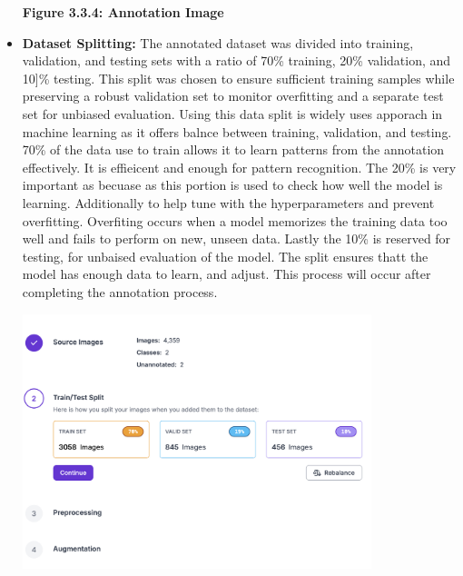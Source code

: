 \begin{itemize}
\begin{center}
		\vspace{0.5em}
		\textbf{Figure 3.3.4: Annotation Image}
	\end{center}
	\newpage
	\item \textbf{Dataset Splitting:}  The annotated dataset was divided into training, validation, and testing sets with a ratio of 70\% training, 20\% validation, and 10]\% testing. This split was chosen to ensure sufficient training samples while preserving a robust validation set to monitor overfitting and a separate test set for unbiased evaluation. Using this data split is widely uses apporach in machine learning as it offers balnce between training, validation, and testing. 70\% of the data use to train allows it to learn patterns from the annotation effectively. It is effieicent and enough for pattern recognition. The 20\% is very important as becuase as this portion is used to check how well the model is learning. Additionally to help tune with the hyperparameters and prevent overfitting. Overfiting occurs when a  model memorizes the training data too well and fails to perform on new, unseen data.  Lastly the 10\% is reserved for testing, for unbaised evaluation of the model. The split ensures thatt the model has enough data to learn, and adjust. This process will occur after completing the annotation process.		
	\begin{center}
		\includegraphics[width=0.8\textwidth]{Split.png}
		

\end{center}
\end{itemize}
